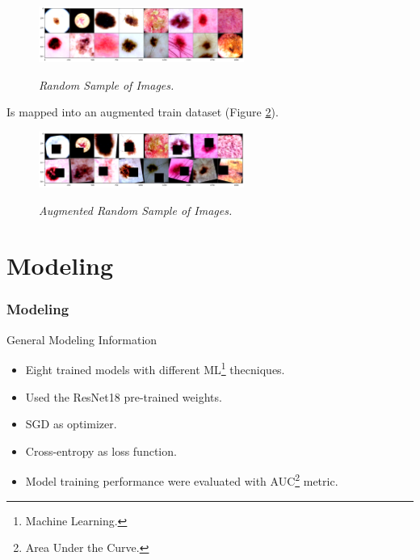 \documentclass[dvipsnames,mathserif]{beamer}
\begin{document}
{\begin{frame}
      \begin{figure}[H]
        \centering
        \includegraphics[width=0.6\textwidth]{images/random-sample-of-isic.png}
        \caption[Random Sample of Images]{\footnotesize{\textit{Random Sample of Images.}}}
        {\label{fig:sample-of-datasets}}
      \end{figure}

      Is mapped into an augmented train dataset (Figure \ref{fig:aug-sample-of-datasets}).

      \begin{figure}[H]
        \centering
        \includegraphics[width=0.6\textwidth]{images/random-sample-of-isic-augmented.png}
        \caption[Augmented Random Sample of Images]{\footnotesize{\textit{Augmented Random Sample of Images.}}}
        {\label{fig:aug-sample-of-datasets}}
      \end{figure}

    \end{frame}



    \section{Modeling}

    \begin{frame}
      \frametitle{Modeling}
    \end{frame}

    \begin{frame}

      \large General Modeling Information
      \vspace{0.25cm}

      \footnotesize

      \begin{itemize}
        \item Eight trained models with different ML\footnote{Machine Learning.} thecniques.
        \item Used the ResNet18 pre-trained weights.
        \item SGD as optimizer.
        \item Cross-entropy as loss function.
        \item Model training performance were evaluated with AUC\footnote{Area Under the Curve.} metric.
      \end{itemize}


\end{frame}}
\end{document}

